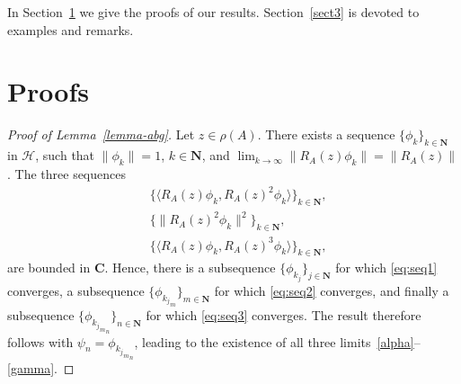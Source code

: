 \documentclass[12pt,a4paper]{article}
\numberwithin{equation}{section}
\theoremstyle{plain}
\theoremstyle{definition}
\newcommand{\norm}[1]{\lVert{#1}\rVert} %
\newcommand{\ip}[2]{\langle{#1},{#2}\rangle} %
\newcommand{\cH}{\mathcal{H}}
\newcommand{\bC}{\mathbf{C}}
\newcommand{\bN}{\mathbf{N}}
\begin{document}
In Section~\ref{sect2} we give the proofs of our results. Section~\ref{sect3} is devoted to examples and remarks.

\section{Proofs}\label{sect2}

\begin{proof}[Proof of Lemma~\ref{lemma-abg}]
	Let $z\in\rho(A)$. There exists a sequence $\{\phi_k\}_{k\in\bN}$ in $\cH$, such that $\norm{\phi_k}=1$, $k\in\bN$, and $\lim_{k\to\infty}\norm{R_A(z)\phi_k}=\norm{R_A(z)}$. 
	The three sequences 
	\begin{align}
		&\{\ip{R_A(z)\phi_k}{R_A(z)^2\phi_k}\}_{k\in\bN}, \label{eq:seq1} \\
		&\{\norm{R_A(z)^2\phi_k}^2\}_{k\in\bN}, \label{eq:seq2} \\
		&\{\ip{R_A(z)\phi_k}{R_A(z)^3\phi_k}\}_{k\in\bN}, \label{eq:seq3}
	\end{align}
	are bounded in $\bC$. Hence, there is a subsequence $\{\phi_{k_j}\}_{j\in\bN}$ for which \eqref{eq:seq1} converges, a subsequence $\{\phi_{{k_j}_m}\}_{m\in\bN}$ for which \eqref{eq:seq2} converges, and finally a subsequence $\{\phi_{{{k_j}_m}_n}\}_{n\in\bN}$ for which \eqref{eq:seq3} converges. The result therefore follows with $\psi_n = \phi_{{{k_j}_m}_n}$, leading to the existence of all three limits~\eqref{alpha}--\eqref{gamma}. 
\end{proof}
\end{document}
